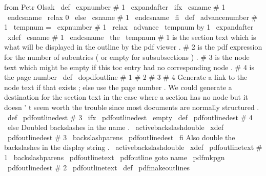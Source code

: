 from
Petr
Olsak
\
def
\
expnumber
#
1
{
\
expandafter
\
ifx
\
csname
#
1
\
endcsname
\
relax
0
%
\
else
\
csname
#
1
\
endcsname
\
fi
}
\
def
\
advancenumber
#
1
{
\
tempnum
=
\
expnumber
{
#
1
}
\
relax
\
advance
\
tempnum
by
1
\
expandafter
\
xdef
\
csname
#
1
\
endcsname
{
\
the
\
tempnum
}
}
%
%
#
1
is
the
section
text
which
is
what
will
be
displayed
in
the
%
outline
by
the
pdf
viewer
.
#
2
is
the
pdf
expression
for
the
number
%
of
subentries
(
or
empty
for
subsubsections
)
.
#
3
is
the
node
text
%
which
might
be
empty
if
this
toc
entry
had
no
corresponding
node
.
%
#
4
is
the
page
number
%
\
def
\
dopdfoutline
#
1
#
2
#
3
#
4
{
%
%
Generate
a
link
to
the
node
text
if
that
exists
;
else
use
the
%
page
number
.
We
could
generate
a
destination
for
the
section
%
text
in
the
case
where
a
section
has
no
node
but
it
doesn
'
t
%
seem
worth
the
trouble
since
most
documents
are
normally
structured
.
\
def
\
pdfoutlinedest
{
#
3
}
%
\
ifx
\
pdfoutlinedest
\
empty
\
def
\
pdfoutlinedest
{
#
4
}
%
\
else
%
Doubled
backslashes
in
the
name
.
{
\
activebackslashdouble
\
xdef
\
pdfoutlinedest
{
#
3
}
%
\
backslashparens
\
pdfoutlinedest
}
%
\
fi
%
%
Also
double
the
backslashes
in
the
display
string
.
{
\
activebackslashdouble
\
xdef
\
pdfoutlinetext
{
#
1
}
%
\
backslashparens
\
pdfoutlinetext
}
%
%
\
pdfoutline
goto
name
{
\
pdfmkpgn
{
\
pdfoutlinedest
}
}
#
2
{
\
pdfoutlinetext
}
%
}
%
\
def
\
pdfmakeoutlines
